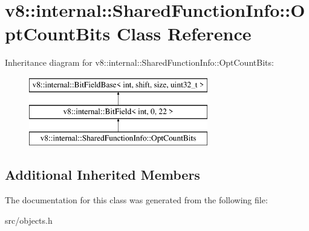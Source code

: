 \hypertarget{classv8_1_1internal_1_1_shared_function_info_1_1_opt_count_bits}{}\section{v8\+:\+:internal\+:\+:Shared\+Function\+Info\+:\+:Opt\+Count\+Bits Class Reference}
\label{classv8_1_1internal_1_1_shared_function_info_1_1_opt_count_bits}
Inheritance diagram for v8\+:\+:internal\+:\+:Shared\+Function\+Info\+:\+:Opt\+Count\+Bits\+:\begin{figure}[H]
\begin{center}
\leavevmode
\includegraphics[height=3.000000cm]{classv8_1_1internal_1_1_shared_function_info_1_1_opt_count_bits}
\end{center}
\end{figure}
\subsection*{Additional Inherited Members}


The documentation for this class was generated from the following file\+:\begin{DoxyCompactItemize}
\item 
src/objects.\+h\end{DoxyCompactItemize}
